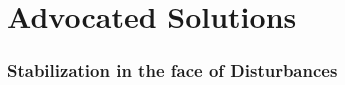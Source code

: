 \documentclass[a4paper,10pt,twoside]{article}
\begin{document}

\part{Advocated Solutions}
    \cleardoublepage



  \section{Stabilization in the face of Disturbances}
    \label{sec:stabilization_with_disturbance}

    
    
    
    
    \cleardoublepage



\end{document}
